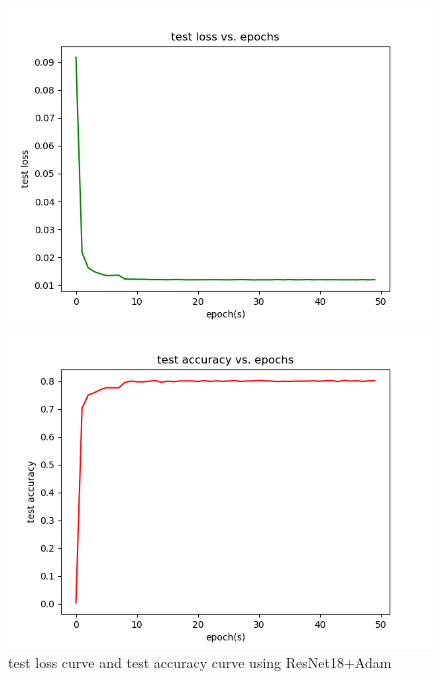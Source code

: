 \documentclass[cn]{elegantbook}
\begin{document}
\begin{figure}[!h]
	\centering
	\begin{minipage}[t]{0.48\textwidth}
		\centering
		\includegraphics[width=\textwidth]{../results/testloss_res_adam}
	\end{minipage}
	\begin{minipage}[t]{0.48\textwidth}
		\centering
		\includegraphics[width=\textwidth]{../results/testacc_res_adam}
	\end{minipage}
	\caption{\label{testres_res_adam}test loss curve and test accuracy curve using ResNet18+Adam}
\end{figure}
\end{document}

